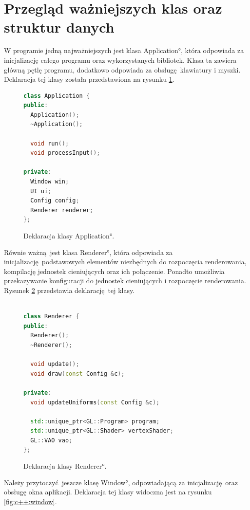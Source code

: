 \section{Przegląd ważniejszych klas oraz struktur danych}
W programie jedną najważniejszych jest klasa \ang{Application}, która odpowiada za inicjalizację całego programu oraz wykorzystanych bibliotek. Klasa ta zawiera główną pętlę programu, dodatkowo odpowiada za obsługę klawiatury i myszki. Deklaracja tej klasy została przedstawiona na rysunku \ref{fig:c++:application}.

\begin{figure}[H]
\centering
\begin{lstlisting}[language=C++]
class Application {
public:
  Application();
  ~Application();

  void run();
  void processInput();

private:
  Window win;
  UI ui;
  Config config;
  Renderer renderer;
};
\end{lstlisting}
\caption{Deklaracja klasy \ang{Application}.}
\label{fig:c++:application}
\end{figure}

Równie ważną jest klasa \ang{Renderer}, która odpowiada za inicjalizację podstawowych elementów niezbędnych do rozpoczęcia renderowania, kompilację jednostek cieniujących oraz ich połączenie. Ponadto umożliwia przekazywanie konfiguracji do jednostek cieniujących i rozpoczęcie renderowania. Rysunek \ref{fig:c++:renderer} przedstawia deklarację tej klasy.

\begin{figure}[H]
\centering
\begin{lstlisting}[language=C++]

class Renderer {
public:
  Renderer();
  ~Renderer();

  void update();
  void draw(const Config &c);

private:
  void updateUniforms(const Config &c);

  std::unique_ptr<GL::Program> program;
  std::unique_ptr<GL::Shader> vertexShader;
  GL::VAO vao;
};

\end{lstlisting}
\caption{Deklaracja klasy \ang{Renderer}.}
\label{fig:c++:renderer}
\end{figure}

Należy przytoczyć jeszcze klasę \ang{Window}, odpowiadającą za inicjalizację oraz obsługę okna aplikacji.
Deklaracja tej klasy widoczna jest na rysunku \ref{fig:c++:window}.

